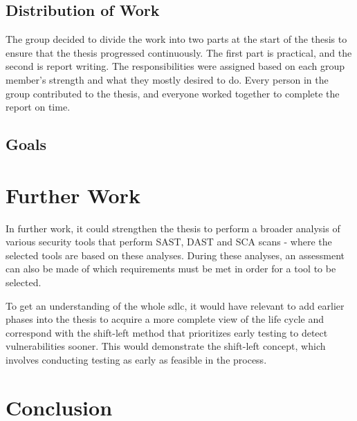 
\subsection{Distribution of Work}
The group decided to divide the work into two parts at the start of the thesis to ensure that the thesis progressed continuously. The first part is practical, and the second is report writing. The responsibilities were assigned based on each group member's strength and what they mostly desired to do. Every person in the group contributed to the thesis, and everyone worked together to complete the report on time. 


\subsection{Goals}



\section{Further Work}

In further work, it could strengthen the thesis to perform a broader analysis of various security tools that perform SAST, DAST and SCA scans -  where the selected tools are based on these analyses. During these analyses, an assessment can also be made of which requirements must be met in order for a tool to be selected. 

To get an understanding of the whole \acrlong{sdlc}, it would have relevant to add earlier phases into the thesis to acquire a more complete view of the life cycle and correspond with the shift-left method that prioritizes early testing to detect vulnerabilities sooner. This would demonstrate the shift-left concept, which involves conducting testing as early as feasible in the process.  

\section{Conclusion}
